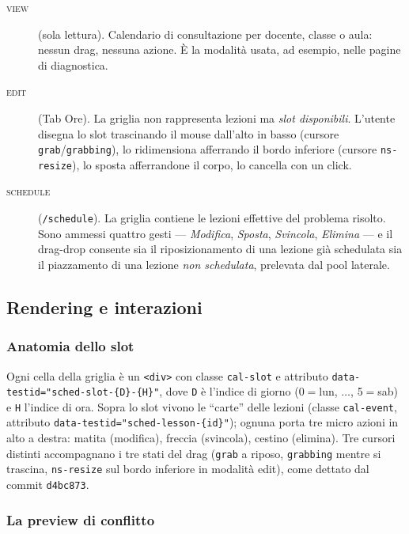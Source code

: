 \begin{description}
  \item[\textsc{view}] (sola lettura). Calendario di consultazione
    per docente, classe o aula: nessun drag, nessuna azione.
    \`E la modalit\`a usata, ad esempio, nelle pagine di
    diagnostica.
  \item[\textsc{edit}] (Tab Ore). La griglia non rappresenta
    lezioni ma \emph{slot disponibili}. L'utente disegna lo
    slot trascinando il mouse dall'alto in basso (cursore
    \texttt{grab}/\texttt{grabbing}), lo ridimensiona afferrando
    il bordo inferiore (cursore \texttt{ns-resize}), lo sposta
    afferrandone il corpo, lo cancella con un click.
  \item[\textsc{schedule}] (\texttt{/schedule}). La griglia
    contiene le lezioni effettive del problema risolto. Sono
    ammessi quattro gesti --- \emph{Modifica}, \emph{Sposta},
    \emph{Svincola}, \emph{Elimina} --- e il drag-drop
    consente sia il riposizionamento di una lezione gi\`a
    schedulata sia il piazzamento di una lezione \emph{non
    schedulata}, prelevata dal pool laterale.
\end{description}

\subsection{Rendering e interazioni}

\subsubsection{Anatomia dello slot}

Ogni cella della griglia \`e un \texttt{<div>} con classe
\texttt{cal-slot} e attributo \texttt{data-testid="sched-slot-\{D\}-\{H\}"},
dove \texttt{D} \`e l'indice di giorno (0$=$lun, $\dots$, 5$=$sab)
e \texttt{H} l'indice di ora. Sopra lo slot vivono le ``carte''
delle lezioni (classe \texttt{cal-event}, attributo
\texttt{data-testid="sched-lesson-\{id\}"}); ognuna porta tre micro
azioni in alto a destra: matita (modifica), freccia (svincola),
cestino (elimina). Tre cursori distinti accompagnano i tre stati
del drag (\texttt{grab} a riposo, \texttt{grabbing} mentre si
trascina, \texttt{ns-resize} sul bordo inferiore in modalit\`a
edit), come dettato dal commit \texttt{d4bc873}.

\subsubsection{La preview di conflitto}

